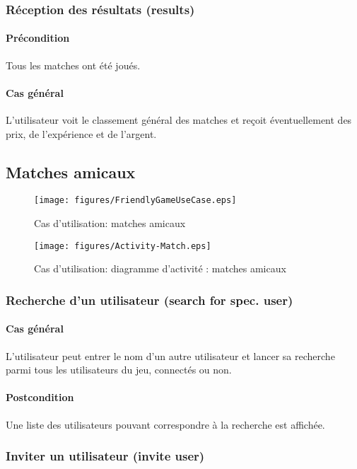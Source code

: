 \subsubsection{Réception des résultats (results)}
	\paragraph{Précondition} Tous les matches ont été joués.
	\paragraph{Cas général} L'utilisateur voit le classement général des matches et reçoit éventuellement des prix, de l'expérience et de l'argent.

\subsection{Matches amicaux}
\begin{figure}[h!]
  \centering
  \texttt{[image: figures/FriendlyGameUseCase.eps]}
  \caption{\label{fig:UC:FriendlyMatch} Cas d'utilisation: matches amicaux}
\end{figure}
\begin{figure}[h!]
  \centering
  \texttt{[image: figures/Activity-Match.eps]}
  \caption{\label{fig:UC:act-FriendlyMatch} Cas d'utilisation: diagramme d'activité : matches amicaux}
\end{figure}

\subsubsection{Recherche d'un utilisateur (search for spec. user)}
\paragraph{Cas général} L'utilisateur peut entrer le nom d'un autre utilisateur et lancer sa recherche parmi tous les utilisateurs du jeu, connectés ou non.
\paragraph{Postcondition} Une liste des utilisateurs pouvant correspondre à la recherche est affichée.

\subsubsection{Inviter un utilisateur (invite user)}

